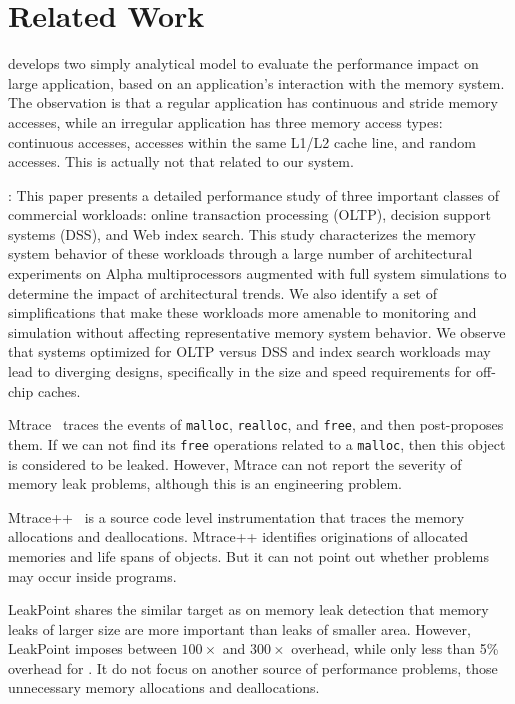 \section{Related Work}

\cite{1291361} develops two simply analytical model to evaluate the performance impact on large application, based on an application's interaction with the memory system. The observation is that a regular application has continuous and stride memory accesses, while an irregular application has three memory access types: continuous accesses, accesses within the same L1/L2 cache line, and random accesses. This is actually not that related to our system. 


\cite{Barroso:1998:MSC:279358.279363}: This paper presents a detailed performance study of three important classes of commercial workloads: online transaction processing (OLTP), decision support systems (DSS), and Web index search.  This study characterizes the memory system behavior of these workloads through a large number of architectural experiments on Alpha multiprocessors augmented with full system simulations to determine the impact of architectural trends. We also identify a set of simplifications that make these workloads more amenable to monitoring and simulation without affecting representative memory system behavior. We observe that systems optimized for OLTP versus DSS and index search workloads may lead to diverging designs, specifically in the size and speed requirements for off-chip caches.

Mtrace~\cite{mtrace} traces the events of \texttt{malloc}, \texttt{realloc}, and \texttt{free}, and then post-proposes them. If we can not find its \texttt{free} operations related to a \texttt{malloc}, then this object is considered to be leaked. However, Mtrace can not report the severity of memory leak problems, although this is an engineering problem.    

Mtrace++~\cite{Lee:2000:DMM:786772.787150} is a source code level instrumentation that traces the memory allocations and deallocations. Mtrace++ identifies originations of allocated memories and life spans of objects. But it can not point out whether problems may occur inside programs. 

\cite{846583}

\cite{1190248}

LeakPoint\cite{Clause:2010:LPC:1806799.1806874} shares the similar target as \HeapPerf{} on memory leak detection that memory leaks of larger size
are more important than leaks of smaller area. However, LeakPoint imposes between $100\times$ and $300\times$ overhead, while only less than 5\% overhead for \HeapPerf{}. It do not focus on another source of performance problems, those unnecessary memory allocations and deallocations. 



